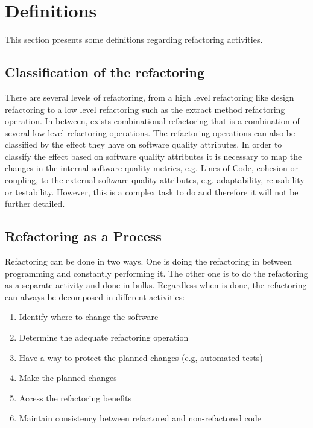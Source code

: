 \section{Definitions}



This section presents some definitions regarding refactoring activities.

\subsection{Classification of the refactoring}
There are several levels of refactoring, from a high level refactoring like design refactoring to a low level refactoring such as the extract method refactoring operation. 
In between, exists combinational refactoring that is a combination of several low level refactoring operations.
The refactoring operations can also be classified by the effect they have on software quality attributes.
In order to classify the effect based on software quality attributes it is necessary to map the changes in the internal software quality metrics, e.g. Lines of Code, cohesion or coupling, to the external software quality attributes, e.g. adaptability, reusability or testability. \cite{elish2011classification}
However, this is a complex task to do and therefore it will not be further detailed.


\subsection{Refactoring as a Process}
Refactoring can be done in two ways. %
One is doing the refactoring in between programming and constantly performing it. 
The other one is to do the refactoring as a separate activity and done in bulks.
Regardless when is done, the refactoring can always be decomposed in different activities: \cite{erb2010survey}

\begin{enumerate}
 \item Identify where to change the software
 \item Determine the adequate refactoring operation
 \item Have a way to protect the planned changes (e.g, automated tests)
 \item Make the planned changes
 \item Access the refactoring benefits
 \item Maintain consistency between refactored and non-refactored code 
\end{enumerate}



